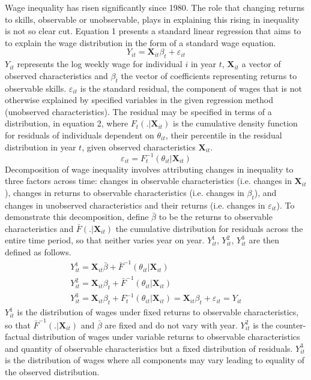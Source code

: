\documentclass[notitlepage,12pt]{article}
\begin{document}
Wage inequality has risen significantly since 1980.  The role that changing returns to skills, observable or unobservable, plays in explaining this rising in inequality is not so clear cut.  Equation 1 presents a standard linear regression that aims to to explain the wage distribution in the form of a standard wage equation. 
\begin{equation}
Y_{it} = \mathbf{X}_{it}\beta_t + \varepsilon_{it}
\end{equation}
$Y_{it}$ represents the log weekly wage for individual $i$ in year $t$, $\mathbf{X}_{it}$ a vector of observed characteristics and $\beta_t$ the vector of coefficients representing returns to observable skills. $\varepsilon_{it}$ is the standard residual, the component of wages that is not otherwise explained by specified variables in the given regression method (unobserved characteristics).  The residual may be specified in terms of a distribution, in equation 2, where $F_{t}(. | \mathbf{X}_{it})$ is the cumulative density function for residuals of individuals dependent on $\theta_{it}$, their percentile in the residual distribution in year $t$, given observed characteristics $\mathbf{X}_{it}$.
\begin{equation}
\varepsilon_{it} = F_{t}^{-1}(\theta_{it} | \mathbf{X}_{it})
\end{equation}
\nocite{autor200914}
Decomposition of wage inequality involves attributing changes in inequality to three factors across time: changes in observable characteristics (i.e. changes in $\mathbf{X}_{it}$), changes in returns to observable characteristics (i.e. changes in $\beta_t$), and changes in unobserved characteristics and their returns (i.e. changes in $\varepsilon_{it}$).  To demonstrate this decomposition, define $\bar{\beta}$ to be the returns to observable characteristics and $\bar{F}(. | \mathbf{X}_{it})$ the cumulative distribution for residuals across the entire time period, so that neither varies year on year.  $Y_{it}^1$, $Y_{it}^2$, $Y_{it}^3$ are then defined as follows.
\begin{gather}
Y_{it}^1 = \mathbf{X}_{it}\bar{\beta} + \bar{F}^{-1}(\theta_{it} | \mathbf{X}_{it}) \\
Y_{it}^2 = \mathbf{X}_{it}\beta_t + \bar{F}^{-1}(\theta_{it} | \mathbf{X}_{it}) \\
Y_{it}^3  = \mathbf{X}_{it}\beta_t + F_{t}^{-1}(\theta_{it} | \mathbf{X}_{it}) = \mathbf{X}_{it}\beta_t + \varepsilon_{it}  = Y_{it}
\end{gather}
$Y_{it}^1$ is the distribution of wages under fixed returns to observable characteristics, so that $\bar{F}^{-1}(. | \mathbf{X}_{it})$ and $\bar{\beta}$ are fixed and do not vary with year.  $Y_{it}^2$ is the counter-factual distribution of wages under variable returns to observable characteristics and quantity of observable characteristics but a fixed distribution of residuals.  $Y_{it}^3$ is the distribution of wages where all components may vary leading to equality of the observed distribution.
\end{document}

